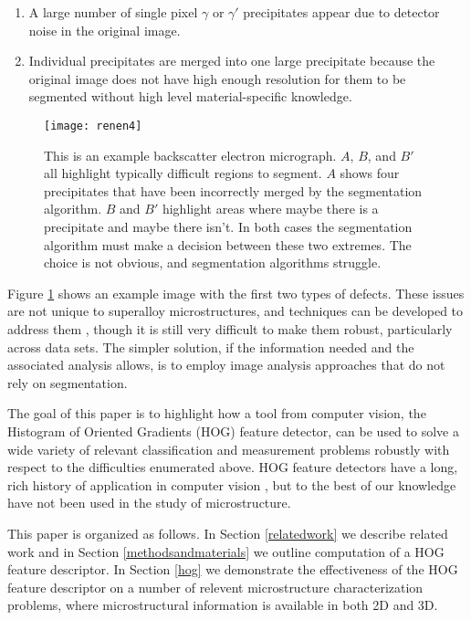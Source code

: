 \documentclass[review]{elsarticle}
\begin{document}
		\begin{enumerate}
			\item \label{prob1} A large number of single pixel $\gamma$ or $\gamma'$ precipitates appear due to detector noise in the original image.
			\item Individual precipitates are merged into one large precipitate because the original image does not have high enough resolution for them to be segmented without high level material-specific knowledge.
		\end{enumerate}
	
		\begin{figure}[!ht]
	  		\centering
			\texttt{[image: renen4]}
	  		\caption{ This is an example backscatter electron micrograph. $A$, $B$, and $B'$ all highlight typically difficult regions to segment. $A$ shows four precipitates that have been incorrectly merged by the segmentation algorithm. $B$ and $B'$ highlight areas where maybe there is a precipitate and maybe there isn't. In both cases the segmentation algorithm must make a decision between these two extremes. The choice is not obvious, and segmentation algorithms struggle. }
	  		\label{figure1}
		\end{figure}

		Figure \ref{figure1} shows an example image with the first two types of defects. These issues are not unique to superalloy microstructures, and techniques can be developed to address them \cite{comer, marc1, marc2, marc3}, though it is still very difficult to make them robust, particularly across data sets. The simpler solution, if the information needed and the associated analysis allows, is to employ image analysis approaches that do not rely on segmentation.
	

		The goal of this paper is to highlight how a tool from computer vision, the Histogram of Oriented Gradients (HOG) feature detector, can be used to solve a wide variety of relevant classification and measurement problems robustly with respect to the difficulties enumerated above. HOG feature detectors have a long, rich history of application in computer vision \cite{gradtex, hog, girsh}, but to the best of our knowledge have not been used in the study of microstructure.

		This paper is organized as follows. In Section \ref{relatedwork} we describe related work and in Section \ref{methodsandmaterials} we outline computation of a HOG feature descriptor. In Section \ref{hog} we demonstrate the effectiveness of the HOG feature descriptor on a number of relevent microstructure characterization problems, where microstructural information is available in both 2D and 3D.
	
\end{document}
